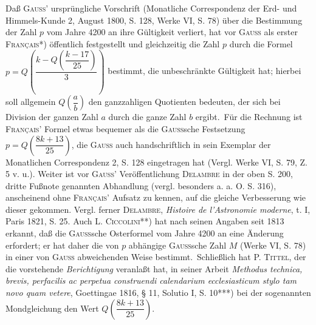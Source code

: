 \noindent\hspace*{\parindent}Daß \textsc{Gauss}' ursprüngliche Vorschrift (Monatliche Correspondenz der Erd- und Himmels-Kunde 2, August 1800, S. 128, Werke VI, S. 78) über die Bestimmung der Zahl $p$ vom Jahre 4200 an ihre Gültigkeit verliert, hat vor \textsc{Gauss} als erster \textsc{Français}*) öffentlich festgestellt und gleichzeitig die Zahl $p$ durch die Formel $p=Q\left(\dfrac{k-Q\left(\dfrac{k-17}{25}\right)}{3}\right)$ bestimmt, die unbeschränkte Gültigkeit hat; hierbei soll allgemein $Q\left(\dfrac{a}{b}\right)$ den ganzzahligen Quotienten bedeuten, der sich bei Division der ganzen Zahl $a$ durch die ganze Zahl $b$ ergibt.\begingroup\renewcommand{\thefootnote}{}\endgroup\ Für die Rechnung ist \textsc{Français}' Formel etwas bequemer als die \textsc{Gauss}sche Festsetzung $p=Q\left(\dfrac{8k+13}{25}\right)$, die \textsc{Gauss} auch handschriftlich in sein Exemplar der Monatlichen Correspondenz 2, S. 128 eingetragen hat (Vergl. Werke VI, S. 79, Z. 5 v. u.). Weiter ist vor \textsc{Gauss}' Veröffentlichung \textsc{Delambre} in der oben S. 200, dritte Fußnote genannten Abhandlung (vergl. besonders a. a. O. S. 316), anscheinend ohne \textsc{Français}' Aufsatz zu kennen, auf die gleiche Verbesserung wie dieser gekommen. Vergl. ferner \textsc{Delambre}, \textit{Histoire de l'Astronomie moderne}, t. I, Paris 1821, S. 25. Auch L. \textsc{Ciccolini}**) hat nach seinen Angaben seit 1813 erkannt, daß die \textsc{Gauss}sche Osterformel vom Jahre 4200 an eine Änderung erfordert; er hat daher die von $p$ abhängige \textsc{Gauss}sche Zahl $M$ (Werke VI, S. 78) in einer von \textsc{Gauss} abweichenden Weise bestimmt.\begingroup\renewcommand{\thefootnote}{}\endgroup\ Schließlich hat P. \textsc{Tittel}, der die vorstehende \textit{Berichtigung} veranlaßt hat, in seiner Arbeit \textit{Methodus technica, brevis, perfacilis ac perpetua construendi calendarium ecclesiasticum stylo tam novo quam vetere}, Goettingae 1816, § 11, Solutio I, S. 10***) bei der sogenannten Mondgleichung den Wert $Q\left(\dfrac{8k+13}{25}\right)$.\begingroup\renewcommand{\thefootnote}{}\endgroup

